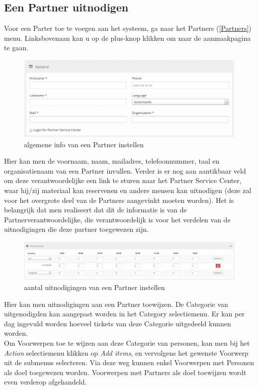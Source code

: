 \documentclass[]{memoir}
\begin{document}
\subsection{Een Partner uitnodigen} \label{AddPartner}
Voor een Parter toe te voegen aan het systeem, ga naar het Partners (\ref{Partners}) menu. Linksbovenaan kan u op de plus-knop klikken om naar de aanmaakpagina te gaan.
\begin{figure}[H]
	\includegraphics[width=\linewidth]{addPartner_general}
	\caption{algemene info van een Partner instellen}
\end{figure}
Hier kan men de voornaam, naam, mailadres, telefoonnummer, taal en organisatienaam van een Partner invullen. Verder is er nog aan aantikbaar veld om deze verantwoordelijke een link te sturen naar het Partner Service Center, waar hij/zij materiaal kan reservenen en andere mensen kan uitnodigen (deze zal voor het overgrote deel van de Partners aangevinkt moeten worden). Het is belangrijk dat men realiseert dat dit de informatie is van de Partnerverantwoordelijke, die verantwoordelijk is voor het verdelen van de uitnodigingen die deze partner toegewezen zijn.
\begin{figure}[H]
	\includegraphics[width=\linewidth]{addPartner_date}
	\caption{aantal uitnodigingen van een Partner instellen}
	\label{img:Partnerdate}
\end{figure}
Hier kan men uitnodigingen aan een Partner toewijzen. De Categorie van uitgenodigden kan aangepast worden in het Category selectiemenu. Er kan per dag ingevuld worden hoeveel tickets van deze Categorie uitgedeeld kunnen worden. \\  Om Voorwerpen toe te wijzen aan deze Categorie van personen, kan men bij het \textsl{Action} selectiemenu klikken op \textsl{Add items}, en vervolgens het gewenste Voorwerp uit de submenus selecteren. Via deze weg kunnen enkel Voorwerpen met Personen als doel toegewezen worden. Voorwerpen met Partners als doel toewijzen wordt even verderop afgehandeld. \\
\end{document}
